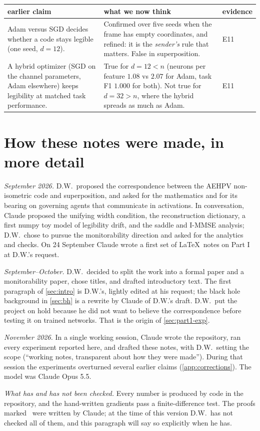 \begin{center}\small
\begin{tabularx}{\linewidth}{@{}>{\raggedright\arraybackslash}p{4.6cm}>{\raggedright\arraybackslash}X l@{}}\toprule
earlier claim & what we now think & evidence \\\midrule
Adam versus SGD decides whether a code stays legible (one seed, $d=12$). & Confirmed over five seeds when the frame
has empty coordinates, and refined: it is the \emph{sender's} rule that matters. False in superposition. & E11 \\
A hybrid optimizer (SGD on the channel parameters, Adam elsewhere) keeps legibility at matched task performance. &
True for $d=12<n$ (neurons per feature $1.08$ vs $2.07$ for Adam, task F1 $1.000$ for both). Not true for $d=32>n$,
where the hybrid spreads as much as Adam. & E11 \\
\bottomrule\end{tabularx}
\end{center}

\section{How these notes were made, in more detail}\label{app:provenance}

\emph{September 2026.} D.W.\ proposed the correspondence between the AEHPV non-isometric code and superposition, and
asked for the mathematics and for its bearing on governing agents that communicate in activations. In conversation,
Claude proposed the unifying width condition, the reconstruction dictionary, a first numpy toy model of legibility
drift, and the saddle and I-MMSE analysis; D.W.\ chose to pursue the monitorability direction and asked for the
analytics and checks. On 24 September Claude wrote a first set of \LaTeX\ notes on Part I at D.W.'s request.

\emph{September--October.} D.W.\ decided to split the work into a formal paper and a monitorability paper, chose
titles, and drafted introductory text. The first paragraph of \cref{sec:intro} is D.W.'s, lightly edited at his
request; the black hole background in \cref{sec:bh} is a rewrite by Claude of D.W.'s draft. D.W.\ put the project on
hold because he did not want to believe the correspondence before testing it on trained networks. That is the origin of
\cref{sec:part1-exp}.

\emph{November 2026.} In a single working session, Claude wrote the repository, ran every experiment reported here,
and drafted these notes, with D.W.\ setting the scope (``working notes, transparent about how they were made'').
During that session the experiments overturned several earlier claims (\cref{app:corrections}). The model was Claude
Opus 5.5.

\emph{What has and has not been checked.} Every number is produced by code in the repository, and the hand-written
gradients pass a finite-difference test. The proofs marked \proved\ were written by Claude; at the time of this
version D.W.\ has not checked all of them, and this paragraph will say so explicitly when he has.
